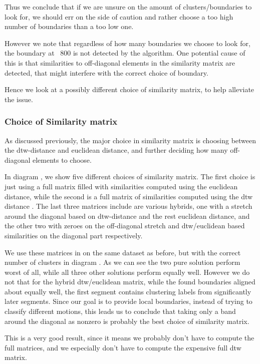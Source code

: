 Thus we conclude that if we are unsure on the amount of clusters/boundaries to look for, we should err on the side of caution and rather choose a too high number of boundaries than a too low one.

However we note that regardless of how many boundaries we choose to look for, the boundary at ~800  is not detected by the algorithm. One potential cause of this is that similarities to off-diagonal elements in the similarity matrix are detected, that might interfere with the correct choice of boundary.

Hence we look at a possibly different choice of similarity matrix, to help alleviate the issue.
\subsubsection{Choice of Similarity matrix}
As discussed previously, the major choice in similarity matrix is choosing between the dtw-distance and euclidean distance, and further deciding how many off-diagonal elements to choose. 

In diagram , we show five different choices of similarity matrix. The first choice is just using a full matrix filled with similarities computed using the euclidean distance, while the second is a full matrix of similarities computed using the dtw distance . The last three matrices include are various hybrids, one with a stretch around the diagonal based on dtw-distance and the rest euclidean distance, and the other two with zeroes on the off-diagonal stretch and dtw/euclidean based similarities on the diagonal part respectively.


We use these matrices in on the same dataset as before, but with the correct number of clusters in diagram  . As we can see the two pure solution perform worst of all, while all three other solutions perform equally well. However we do not that for the hybrid dtw/euclidean matrix, while the found boundaries aligned about equally well, the first segment contains clustering labels from significantly later segments. Since our goal is to provide local boundaries, instead of trying to classify different motions, this leads us to conclude that taking only a band around the diagonal as nonzero is probably the best choice of similarity matrix. 

This is a very good result, since it means we probably don't have to compute the full matrices, and we especially don't have to compute the expensive full dtw matrix. 




